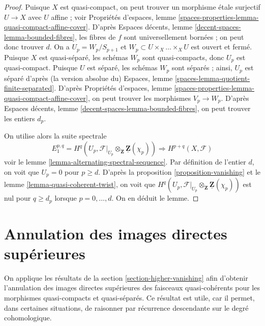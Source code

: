 \begin{proof}
Puisque $X$ est quasi-compact, on peut trouver un morphisme \'etale surjectif
$U \to X$ avec $U$ affine ; voir
Propriétés d'espaces, lemme
\ref{spaces-properties-lemma-quasi-compact-affine-cover}.
D'après
Espaces décents, lemme \ref{decent-spaces-lemma-bounded-fibres},
les fibres de $f$ sont universellement bornées ; on peut donc trouver $d$.
On a $U_p = W_p/S_{p + 1}$ et $W_p \subset U \times_X \ldots \times_X U$
est ouvert et fermé. Puisque $X$ est quasi-séparé, les schémas
$W_p$ sont quasi-compacts, donc $U_p$ est quasi-compact.
Puisque $U$ est séparé, les schémas $W_p$ sont séparés ; ainsi,
$U_p$ est séparé d'après (la version absolue du)
Espaces, lemme \ref{spaces-lemma-quotient-finite-separated}.
D'après
Propriétés d'espaces, lemme
\ref{spaces-properties-lemma-quasi-compact-affine-cover},
on peut trouver les morphismes $V_p \to W_p$.
D'après
Espaces décents, lemme \ref{decent-spaces-lemma-bounded-fibres},
on peut trouver les entiers $d_p$.

\medskip\noindent
On utilise alors la suite spectrale
$$
E_1^{p, q} =
H^q(U_p, \mathcal{F}|_{U_p} \otimes_\mathbf{Z} \underline{\mathbf{Z}}(\chi_p))
\Rightarrow
H^{p + q}(X, \mathcal{F})
$$
voir
le lemme \ref{lemma-alternating-spectral-sequence}.
Par définition de l'entier $d$, on voit que $U_p = 0$ pour $p \geq d$.
D'après la proposition \ref{proposition-vanishing}
et
le lemme \ref{lemma-quasi-coherent-twist},
on voit que
$H^q(U_p,
\mathcal{F}|_{U_p} \otimes_\mathbf{Z} \underline{\mathbf{Z}}(\chi_p))$
est nul pour $q \geq d_p$ lorsque $p = 0, \ldots, d$.
On en déduit le lemme.
\end{proof}









\section{Annulation des images directes supérieures}
\label{section-vanishing-higher-direct-images}

\noindent
On applique les résultats de la
section \ref{section-higher-vanishing}
afin d'obtenir l'annulation des images directes supérieures des faisceaux quasi-cohérents
pour les morphismes quasi-compacts et quasi-séparés. Ce résultat est utile, car
il permet, dans certaines situations, de raisonner par récurrence descendante sur le degré
cohomologique.

